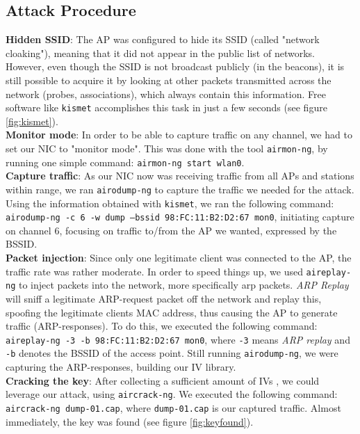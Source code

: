 \documentclass[a4paper,11pt]{article}
\begin{document}
\subsection{Attack Procedure}
\textbf{Hidden SSID}: The AP was configured to hide its SSID (called "network cloaking"), meaning that it did not appear in the public list of networks. However, even though the SSID is not broadcast publicly (in the beacons), it is still possible to acquire it by looking at other packets transmitted across the network (probes, associations), which always contain this information. Free software like \texttt{kismet} accomplishes this task in just a few seconds (see figure \ref{fig:kismet}). \\

\noindent \textbf{Monitor mode}: In order to be able to capture traffic on any channel, we had to set our NIC to "monitor mode". This was done with the tool \texttt{airmon-ng}, by running one simple command: \texttt{airmon-ng start wlan0}. \\

\noindent \textbf{Capture traffic}: As our NIC now was receiving traffic from all APs and stations within range, we ran \texttt{airodump-ng} to capture the traffic we needed for the attack. Using the information obtained with \texttt{kismet}, we ran the following command: \texttt{airodump-ng -c 6 -w dump --bssid 98:FC:11:B2:D2:67 mon0}, initiating capture on channel 6, focusing on traffic to/from the AP we wanted, expressed by the BSSID. \\

\noindent \textbf{Packet injection}: Since only one legitimate client was connected to the AP, the traffic rate was rather moderate. In order to speed things up, we used \texttt{aireplay-ng} to inject packets into the network, more specifically \gls{arp} packets. \textit{ARP Replay} will sniff a legitimate ARP-request packet off the network and replay this, spoofing the legitimate clients MAC address, thus causing the AP to generate traffic (ARP-responses). To do this, we executed the following command: \texttt{aireplay-ng -3 -b 98:FC:11:B2:D2:67 mon0}, where \texttt{-3} means \textit{ARP replay} and \texttt{-b} denotes the BSSID of the access point. Still running \texttt{airodump-ng}, we were capturing the ARP-responses, building our IV library. \\

\noindent \textbf{Cracking the key}: After collecting a sufficient amount of IVs \cite{ptw}, we could leverage our attack, using \texttt{aircrack-ng}. We executed the following command: \texttt{aircrack-ng dump-01.cap}, where \texttt{dump-01.cap} is our captured traffic. Almost immediately, the key was found (see figure \ref{fig:keyfound}). \\
\end{document}
